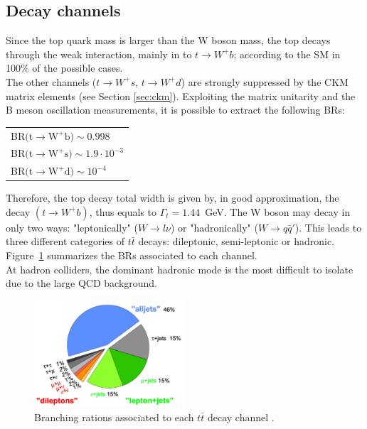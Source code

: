 \subsection{Decay channels}
Since the top quark mass is larger than the W boson mass, the top decays through the weak interaction, mainly in to $t\rightarrow W^{+}b$; according to the SM in 100\% of the possible cases.\\
The other channels ($t\rightarrow W^{+}s$, $t\rightarrow W^{+}d$) are strongly suppressed by the CKM matrix elements (see Section \ref{sec:ckm}). Exploiting the matrix unitarity 
and the B meson oscillation measurements, it is possible to extract the following BRs\cite{tdecayBR}:
\begin{table}[!ht]
	\centering
	\begin{tabular}{l}
		BR$(\mathrm{t \rightarrow W^{+} b)\sim 0.998}$\\
		BR$(\mathrm{t \rightarrow W^{+} s)\sim 1.9\cdot10^{-3}}$\\
		BR$(\mathrm{t \rightarrow W^{+} d)\sim 10^{-4}}$\\
	\end{tabular}
\end{table}
\newline Therefore, the top decay total width is given by, in good approximation, the decay $(t \rightarrow W^{+} b)$, thus equals to $\Gamma_t = 1.44$~GeV.
The W boson may decay in only two ways: "leptonically" ($W\rightarrow l\nu$) or "hadronically" ($W\rightarrow q\bar{q}'$). This leads to three different categories
of $t\bar{t}$ decays: dileptonic, semi-leptonic or hadronic.\\ Figure~\ref{fig:ttBR} summarizes the BRs associated to each channel.\\
At hadron colliders, the dominant hadronic mode is the most difficult to isolate due to the large QCD background.
\begin{figure}[!h]
	\centering
	\includegraphics[width=0.5\textwidth]{Chapters/CH1/figures/ttBR}
	\caption{Branching rations associated to each $t\bar{t}$ decay channel \cite{ttdecayBR}.}
	\label{fig:ttBR}
\end{figure}


